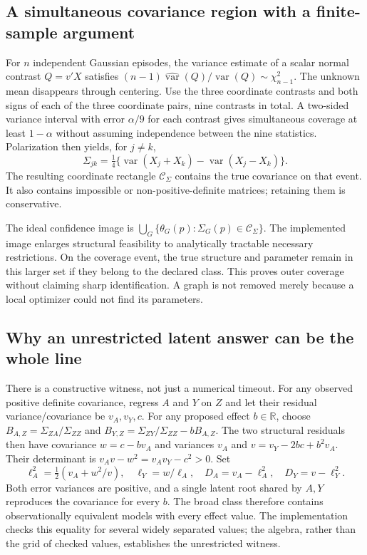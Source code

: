 \subsection{A simultaneous covariance region with a finite-sample argument}
For $n$ independent Gaussian episodes, the variance estimate of a scalar
normal contrast $Q=v'X$ satisfies
$(n-1)\widehat{\operatorname{var}}(Q)/\operatorname{var}(Q)
\sim\chi^2_{n-1}$. The unknown mean disappears through centering.
Use the three coordinate contrasts and both signs of each of the three
coordinate pairs, nine contrasts in total. A two-sided variance interval
with error $\alpha/9$ for each contrast gives simultaneous coverage at least
$1-\alpha$ without assuming independence between the nine statistics.
Polarization then yields, for $j\ne k$,
\[
 \Sigma_{jk}=\tfrac14\{\operatorname{var}(X_j+X_k)
                          -\operatorname{var}(X_j-X_k)\}.
\]
The resulting coordinate rectangle $\mathcal C_\Sigma$ contains the true
covariance on that event. It also contains impossible or non-positive-definite
matrices; retaining them is conservative.

The ideal confidence image is
$\bigcup_G\{\theta_G(p):\Sigma_G(p)\in\mathcal C_\Sigma\}$.
The implemented image enlarges structural feasibility to analytically
tractable necessary restrictions. On the coverage event, the true structure
and parameter remain in this larger set if they belong to the declared class.
This proves outer coverage without claiming sharp identification. A graph is
not removed merely because a local optimizer could not find its parameters.

\subsection{Why an unrestricted latent answer can be the whole line}
There is a constructive witness, not just a numerical timeout. For any observed
positive definite covariance, regress $A$ and $Y$ on $Z$ and let their residual
variance/covariance be $v_A,v_Y,c$. For any proposed effect $b\in\mathbb R$,
choose $B_{A,Z}=\Sigma_{ZA}/\Sigma_{ZZ}$ and
$B_{Y,Z}=\Sigma_{ZY}/\Sigma_{ZZ}-bB_{A,Z}$. The two structural residuals
then have covariance $w=c-bv_A$ and variances $v_A$ and
$v=v_Y-2bc+b^2v_A$. Their determinant is
$v_Av-w^2=v_Av_Y-c^2>0$.
Set
\[
 \ell_A^2=\tfrac12(v_A+w^2/v),\quad
 \ell_Y=w/\ell_A,\quad
 D_A=v_A-\ell_A^2,\quad D_Y=v-\ell_Y^2.
\]
Both error variances are positive, and a single latent root shared by $A,Y$
reproduces the covariance for every $b$. The broad class therefore contains
observationally equivalent models with every effect value. The implementation
checks this equality for several widely separated values; the algebra, rather
than the grid of checked values, establishes the unrestricted witness.

